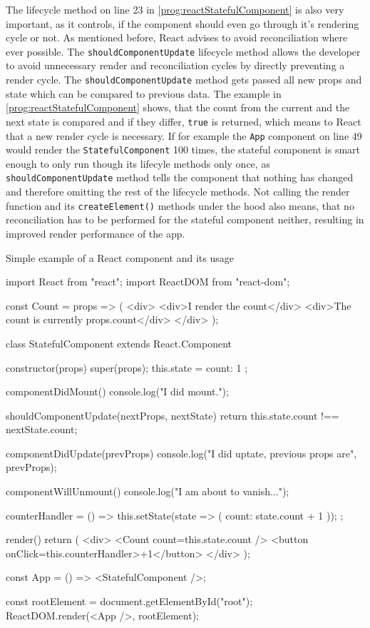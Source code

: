 The lifecycle method on line 23 in \ref{prog:reactStatefulComponent} is also very important, as it controls, if the component should even go through it's rendering cycle or not. As mentioned before, React advises to avoid reconciliation where ever possible. The \texttt{shouldComponentUpdate} lifecycle method allows the developer to avoid unnecessary render and reconciliation cycles by directly preventing a render cycle. The \texttt{shouldComponentUpdate} method gets passed all new props and state which can be compared to previous data. The example in \ref{prog:reactStatefulComponent} shows, that the count from the current and the next state is compared and if they differ, \texttt{true} is returned, which means to React that a new render cycle is necessary. If for example the \texttt{App} component on line 49 would render the \texttt{StatefulComponent} 100 times, the stateful component is smart enough to only run though its lifecyle methods only once, as \texttt{shouldComponentUpdate} method tells the component that nothing has changed and therefore omitting the rest of the lifecycle methods. Not calling the render function and its \texttt{createElement()} methods under the hood also means, that no reconciliation has to be performed for the stateful component neither, resulting in improved render performance of the app.



\begin{program}
\caption{Simple example of a React component and its usage} 
\label{prog:reactStatefulComponent}
\begin{JsCode}
import React from "react";
import ReactDOM from "react-dom";

const Count = props => (
  <div>
    <div>I render the count</div>
    <div>The count is currently {props.count}</div>
  </div>
);

class StatefulComponent extends React.Component {
  constructor(props) {
    super(props);
    this.state = {
      count: 1
    };
  }

  componentDidMount() {
    console.log("I did mount.");
  }

  shouldComponentUpdate(nextProps, nextState) {
    return this.state.count !== nextState.count;
  }

  componentDidUpdate(prevProps) {
    console.log("I did uptate, previous props are", prevProps);
  }

  componentWillUnmount() {
    console.log("I am about to vanish...");
  }

  counterHandler = () => {
    this.setState(state => ({ count: state.count + 1 }));
  };

  render() {
    return (
      <div>
        <Count count={this.state.count} />
        <button onClick={this.counterHandler}>+1</button>
      </div>
    );
  }
}

const App = () => <StatefulComponent />;

const rootElement = document.getElementById("root");
ReactDOM.render(<App />, rootElement);  
\end{JsCode}
\end{program}

